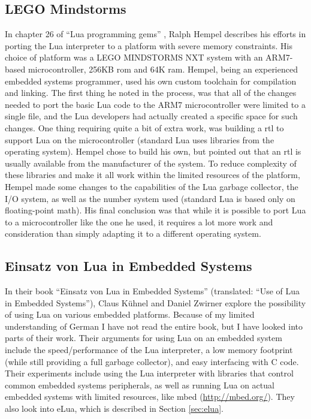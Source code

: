 \subsection{LEGO Mindstorms}
\label{sec:lego_mindstorms}
In chapter 26 of “Lua programming gems” \cite{chapter:porting_lua_microcontroller}, Ralph Hempel describes his efforts in porting the Lua interpreter to a platform with severe memory constraints. His choice of platform was a LEGO MINDSTORMS NXT system with an ARM7-based microcontroller, 256KB \gls{rom} and 64K \gls{ram}. Hempel, being an experienced embedded systems programmer, used his own custom toolchain for compilation and linking. The first thing he noted in the process, was that all of the changes needed to port the basic Lua code to the ARM7 microcontroller were limited to a single file, and the Lua developers had actually created a specific space for such changes. One thing requiring quite a bit of extra work, was building a \gls{rtl} to support Lua on the microcontroller (standard Lua uses libraries from the operating system). Hempel chose to build his own, but pointed out that an \gls{rtl} is usually available from the manufacturer of the system. To reduce complexity of these libraries and make it all work within the limited resources of the platform, Hempel made some changes to the capabilities of the Lua garbage collector, the I/O system, as well as the number system used (standard Lua is based only on floating-point math). His final conclusion was that while it is possible to port Lua to a microcontroller like the one he used, it requires a lot more work and consideration than simply adapting it to a different operating system.

\subsection{Einsatz von Lua in Embedded Systems}
\label{sec:einsatz_von_lua_embedded}
In their book “Einsatz von Lua in Embedded Systems” \cite{book:einsatz_von_lua_embedded} (translated: “Use of Lua in Embedded Systems”), Claus Kühnel and Daniel Zwirner explore the possibility of using Lua on various embedded platforms. Because of my limited understanding of German I have not read the entire book, but I have looked into parts of their work. Their arguments for using Lua on an embedded system include the speed/performance of the Lua interpreter, a low memory footprint (while still providing a full garbage collector), and easy interfacing with C code. Their experiments include using the Lua interpreter with libraries that control common embedded systems peripherals, as well as running Lua on actual embedded systems with limited resources, like mbed (\url{http://mbed.org/}). They also look into eLua, which is described in Section \ref{sec:elua}.

